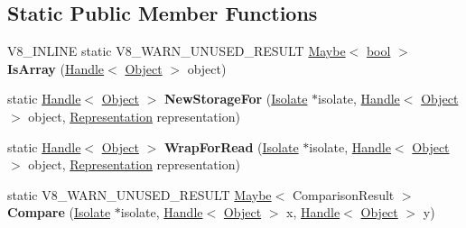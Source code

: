 \subsection*{Static Public Member Functions}
\begin{DoxyCompactItemize}
\item 
\mbox{\label{classv8_1_1internal_1_1Object_aea244e5dbed8840bc5680584365b082d}} 
V8\+\_\+\+I\+N\+L\+I\+NE static V8\+\_\+\+W\+A\+R\+N\+\_\+\+U\+N\+U\+S\+E\+D\+\_\+\+R\+E\+S\+U\+LT \mbox{\hyperlink{classv8_1_1Maybe}{Maybe}}$<$ \mbox{\hyperlink{classbool}{bool}} $>$ {\bfseries Is\+Array} (\mbox{\hyperlink{classv8_1_1internal_1_1Handle}{Handle}}$<$ \mbox{\hyperlink{classv8_1_1internal_1_1Object}{Object}} $>$ object)
\item 
\mbox{\label{classv8_1_1internal_1_1Object_a4ec27010c6dde9b572edde3d6cbed59d}} 
static \mbox{\hyperlink{classv8_1_1internal_1_1Handle}{Handle}}$<$ \mbox{\hyperlink{classv8_1_1internal_1_1Object}{Object}} $>$ {\bfseries New\+Storage\+For} (\mbox{\hyperlink{classv8_1_1internal_1_1Isolate}{Isolate}} $\ast$isolate, \mbox{\hyperlink{classv8_1_1internal_1_1Handle}{Handle}}$<$ \mbox{\hyperlink{classv8_1_1internal_1_1Object}{Object}} $>$ object, \mbox{\hyperlink{classv8_1_1internal_1_1Representation}{Representation}} representation)
\item 
\mbox{\label{classv8_1_1internal_1_1Object_ad298cb85c34c4199e7eff968e5c5cda6}} 
static \mbox{\hyperlink{classv8_1_1internal_1_1Handle}{Handle}}$<$ \mbox{\hyperlink{classv8_1_1internal_1_1Object}{Object}} $>$ {\bfseries Wrap\+For\+Read} (\mbox{\hyperlink{classv8_1_1internal_1_1Isolate}{Isolate}} $\ast$isolate, \mbox{\hyperlink{classv8_1_1internal_1_1Handle}{Handle}}$<$ \mbox{\hyperlink{classv8_1_1internal_1_1Object}{Object}} $>$ object, \mbox{\hyperlink{classv8_1_1internal_1_1Representation}{Representation}} representation)
\item 
\mbox{\label{classv8_1_1internal_1_1Object_a0768353b44fe2e6f663b8dfb7c57461f}} 
static V8\+\_\+\+W\+A\+R\+N\+\_\+\+U\+N\+U\+S\+E\+D\+\_\+\+R\+E\+S\+U\+LT \mbox{\hyperlink{classv8_1_1Maybe}{Maybe}}$<$ Comparison\+Result $>$ {\bfseries Compare} (\mbox{\hyperlink{classv8_1_1internal_1_1Isolate}{Isolate}} $\ast$isolate, \mbox{\hyperlink{classv8_1_1internal_1_1Handle}{Handle}}$<$ \mbox{\hyperlink{classv8_1_1internal_1_1Object}{Object}} $>$ x, \mbox{\hyperlink{classv8_1_1internal_1_1Handle}{Handle}}$<$ \mbox{\hyperlink{classv8_1_1internal_1_1Object}{Object}} $>$ y)

\end{DoxyCompactItemize}
